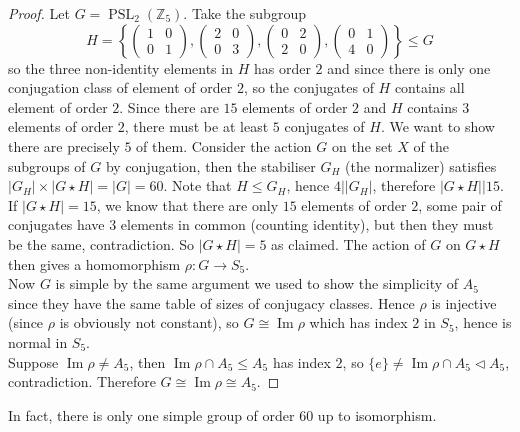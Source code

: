 \begin{proof}
    Let $G=\operatorname{PSL}_2(\mathbb Z_5)$.
    Take the subgroup
    $$H=\left\{ \begin{pmatrix}
        1&0\\
        0&1
    \end{pmatrix},
    \begin{pmatrix}
        2&0\\
        0&3
    \end{pmatrix},
    \begin{pmatrix}
        0&2\\
        2&0
    \end{pmatrix},
    \begin{pmatrix}
        0&1\\
        4&0
    \end{pmatrix}\right\}\le G$$
    so the three non-identity elements in $H$ has order $2$ and since there is only one conjugation class of element of order $2$, so the conjugates of $H$ contains all element of order $2$.
    Since there are $15$ elements of order $2$ and $H$ contains $3$ elements of order $2$, there must be at least $5$ conjugates of $H$.
    We want to show there are precisely $5$ of them.
    Consider the action $G$ on the set $X$ of the subgroups of $G$ by conjugation, then the stabiliser $G_H$ (the normalizer) satisfies $|G_H|\times |G\star H|=|G|=60$.
    Note that $H\le G_H$, hence $4||G_H|$, therefore $|G\star H||15$.
    If $|G\star H|=15$, we know that there are only $15$ elements of order $2$, some pair of conjugates have $3$ elements in common (counting identity), but then they must be the same, contradiction.
    So $|G\star H|=5$ as claimed.
    The action of $G$ on $G\star H$ then gives a homomorphism $\rho:G\to S_5$.\\
    Now $G$ is simple by the same argument we used to show the simplicity of $A_5$ since they have the same table of sizes of conjugacy classes.
    Hence $\rho$ is injective (since $\rho$ is obviously not constant), so $G\cong\operatorname{Im}\rho$ which has index $2$ in $S_5$, hence is normal in $S_5$.\\
    Suppose $\operatorname{Im}\rho\neq A_5$, then $\operatorname{Im}\rho\cap A_5\le A_5$ has index $2$, so $\{e\}\neq\operatorname{Im}\rho\cap A_5\lhd A_5$, contradiction.
    Therefore $G\cong\operatorname{Im}\rho\cong A_5$.
\end{proof}
In fact, there is only one simple group of order $60$ up to isomorphism.\\
